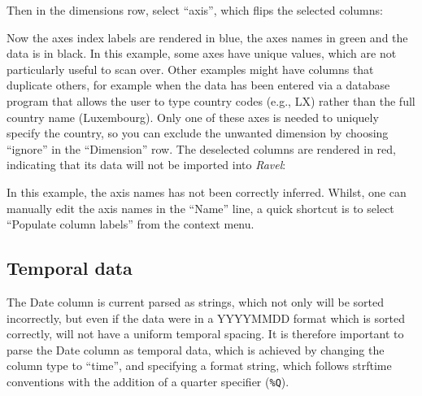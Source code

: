 Then in the dimensions row, select ``axis'', which flips the selected
columns:
\begin{center}
\par\end{center}

Now the axes index labels are rendered in blue, the axes names in
green and the data is in black. In this example, some axes have unique
values, which are not particularly useful to scan over. Other examples
might have columns that duplicate others, for example when the data
has been entered via a database program that allows the user to type
country codes (e.g., LX) rather than the full country name (Luxembourg).
Only one of these axes is needed to uniquely specify the country,
so you can exclude the unwanted dimension by choosing ``ignore''
in the ``Dimension'' row. The deselected columns are rendered in
red, indicating that its data will not be imported into \emph{Ravel}:
\begin{center}
\par\end{center}

In this example, the axis names has not been correctly inferred. Whilst,
one can manually edit the axis names in the ``Name'' line, a quick
shortcut is to select ``Populate column labels'' from the context menu. 
\begin{center}
\par\end{center}

\subsection{Temporal data}

The Date column is current parsed as strings, which not only will
be sorted incorrectly, but even if the data were in a YYYYMMDD format
which is sorted correctly, will not have a uniform temporal spacing.
It is therefore important to parse the Date column as temporal data,
which is achieved by changing the column type to ``time'', and specifying
a format string, which follows strftime conventions with the addition
of a quarter specifier (\verb+%Q+). \label{strftime format specifier}

